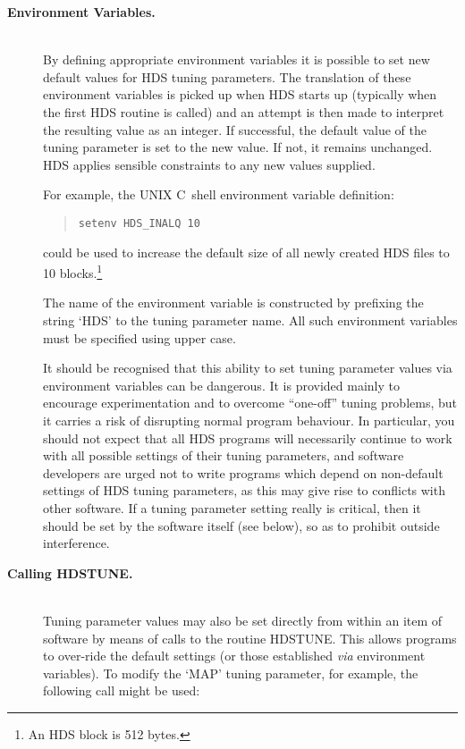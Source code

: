 \documentclass[twoside,11pt]{article}
\newcommand{\htmlref}[2]{#1}
\renewcommand{\_}{\texttt{\symbol{95}}}
\newcommand{\qt}[1]{``#1''}
\newcommand{\st}[1]{{\em{#1}}}
\newcommand{\qt}[1]{{\tt{"}}#1{\tt{"}}}
\begin{document}
\begin{description}

\item[{\bf Environment Variables.}]\mbox{}\\
By defining appropriate environment variables it is possible to set
new default values for HDS tuning parameters. The translation of these
environment variables is picked up when HDS starts up (typically when
the first HDS routine is called) and an attempt is then made to
interpret the resulting value as an integer. If successful, the
default value of the tuning parameter is set to the new value. If not,
it remains unchanged. HDS applies sensible constraints to any new
values supplied.

For example, the UNIX C~shell environment variable definition:

\small
\begin{quote}
\begin{verbatim}
setenv HDS_INALQ 10
\end{verbatim}
\end{quote}
\normalsize

could be used to increase the default size of all newly created HDS
files to 10 blocks.\footnote{An HDS block is 512 bytes.}

The name of the environment variable is constructed by prefixing the
string `HDS\_' to the tuning parameter name. All such environment
variables must be specified using upper case.

It should be recognised that this ability to set tuning parameter
values via environment variables can be dangerous. It is provided
mainly to encourage experimentation and to overcome \qt{one-off}
tuning problems, but it carries a risk of disrupting normal program
behaviour. In particular, you should not expect that all HDS programs
will necessarily continue to work with all possible settings of their
tuning parameters, and software developers are urged not to write
programs which depend on non-default settings of HDS tuning
parameters, as this may give rise to conflicts with other software. If
a tuning parameter setting really is critical, then it should be set
by the software itself (see below), so as to prohibit outside
interference.

\item[{\bf Calling \htmlref{HDS\_TUNE}{HDS_TUNE}.}]\mbox{}\\
Tuning parameter values may also be set directly from within an item
of software by means of calls to the routine HDS\_TUNE. This allows
programs to over-ride the default settings (or those established
\st{via} environment variables). To modify the `MAP' tuning parameter,
for example, the following call might be used:


\end{description}
\end{document}
